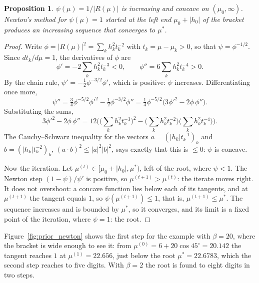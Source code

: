 \documentclass{birkjour}
\newtheorem{prop}[thm]{Proposition}
\theoremstyle{definition}
\theoremstyle{remark}
\numberwithin{equation}{section}
\begin{document}
\begin{prop}
\label{prop:prior_newton}
$\psi(\mu) = 1 / |R(\mu)|$ is increasing and concave on $(\mu_0, \infty)$. Newton's method for $\psi(\mu) = 1$ started at the left end $\mu_0 + |h_0|$ of the bracket produces an increasing sequence that converges to $\mu^*$.
\end{prop}
\begin{proof}
Write $\phi = |R(\mu)|^2 = \sum_k h_k^2 t_k^{-2}$ with $t_k = \mu - \mu_k > 0$, so that $\psi = \phi^{-1/2}$. Since $dt_k / d\mu = 1$, the derivatives of $\phi$ are
\begin{equation*}
\phi' = -2 \sum_k h_k^2 t_k^{-3} < 0, \qquad \phi'' = 6 \sum_k h_k^2 t_k^{-4} > 0 .
\end{equation*}
By the chain rule, $\psi' = -\frac12 \phi^{-3/2} \phi'$, which is positive: $\psi$ increases. Differentiating once more,
\begin{equation*}
\psi'' = \tfrac34 \phi^{-5/2} \phi'^2 - \tfrac12 \phi^{-3/2} \phi'' = \tfrac14 \phi^{-5/2} \big( 3 \phi'^2 - 2 \phi\, \phi'' \big).
\end{equation*}
Substituting the sums,
\begin{equation*}
3 \phi'^2 - 2 \phi\, \phi'' = 12 \Big( \big( \textstyle\sum_k h_k^2 t_k^{-3} \big)^2 - \big( \sum_k h_k^2 t_k^{-2} \big) \big( \sum_k h_k^2 t_k^{-4} \big) \Big).
\end{equation*} The Cauchy--Schwarz inequality for the vectors $a = (|h_k| t_k^{-1})_k$ and $b = (|h_k| t_k^{-2})_k$, $(a \cdot b)^2 \leq |a|^2 |b|^2$, says exactly that this is $\leq 0$: $\psi$ is concave.

Now the iteration. Let $\mu^{(t)} \in [\mu_0 + |h_0|, \mu^*)$, left of the root, where $\psi < 1$. The Newton step $(1 - \psi) / \psi'$ is positive, so $\mu^{(t+1)} > \mu^{(t)}$: the iterate moves right. It does not overshoot: a concave function lies below each of its tangents, and at $\mu^{(t+1)}$ the tangent equals $1$, so $\psi(\mu^{(t+1)}) \leq 1$, that is, $\mu^{(t+1)} \leq \mu^*$. The sequence increases and is bounded by $\mu^*$, so it converges, and its limit is a fixed point of the iteration, where $\psi = 1$: the root.
\end{proof}
Figure~\ref{fig:prior_newton} shows the first step for the example with $\beta = 20$, where the bracket is wide enough to see it: from $\mu^{(0)} = 6 + 20 \cos 45^\circ = 20.142$ the tangent reaches $1$ at $\mu^{(1)} = 22.656$, just below the root $\mu^* = 22.6783$, which the second step reaches to five digits. With $\beta = 2$ the root is found to eight digits in two steps.
\end{document}
